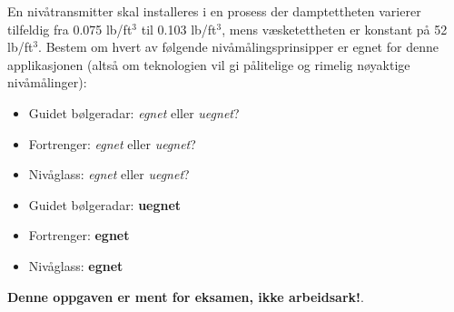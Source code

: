 

En nivåtransmitter skal installeres i en prosess der damptettheten varierer tilfeldig fra 0.075 lb/ft$^{3}$ til 0.103 lb/ft$^{3}$, mens væsketettheten er konstant på 52 lb/ft$^{3}$. Bestem om hvert av følgende nivåmålingsprinsipper er egnet for denne applikasjonen (altså om teknologien vil gi pålitelige og rimelig nøyaktige nivåmålinger):

\begin{itemize}
\item{} Guidet bølgeradar: {\it egnet} eller {\it uegnet}?
\vskip 10pt
\item{} Fortrenger: {\it egnet} eller {\it uegnet}?
\vskip 10pt
\item{} Nivåglass: {\it egnet} eller {\it uegnet}?
\end{itemize}







\begin{itemize}
\item{} Guidet bølgeradar: {\bf uegnet}
\vskip 10pt
\item{} Fortrenger: {\bf egnet}
\vskip 10pt
\item{} Nivåglass: {\bf egnet}
\end{itemize}







{\bf Denne oppgaven er ment for eksamen, ikke arbeidsark!}.


